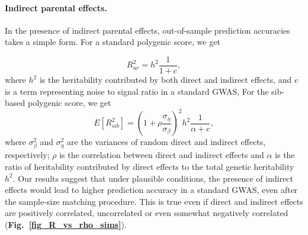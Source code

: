 \documentclass[hidelinks, 12pt]{article}
\begin{document}
\paragraph{Indirect parental effects.}  In the presence of indirect parental effects, out-of-sample prediction accuracies takes a simple form. For a standard polygenic score, we get

$$R_{ur}^2 = h^2\frac{1}{1+c},$$ where $h^2$ is the heritability contributed by both direct and indirect effects, and $c$ is a term representing noise to signal ratio in a standard GWAS,  For the sib-based polygenic score, we get
$$E[R_{sib}^2] = (1+\rho \frac{\sigma_\eta}{\sigma_\beta})^2 h^2 \frac{1}{\alpha + c},$$ where $\sigma_\beta^2$ and $\sigma_\eta^2$ are the variances of random direct and indirect effects, respectively; $\rho$ is the correlation between direct and indirect effects and $\alpha$ is the ratio of heritability contributed by direct effects to the total genetic heritability $h^2$.  Our results suggest that under plausible conditions, the presence of indirect effects would lead to higher prediction accuracy in a standard GWAS,  even after the sample-size matching procedure.  This is true even if direct and indirect effects are positively correlated, uncorrelated or even somewhat negatively correlated ({\bf Fig.~\ref{fig_R_vs_rho_sims}}).
\end{document}
